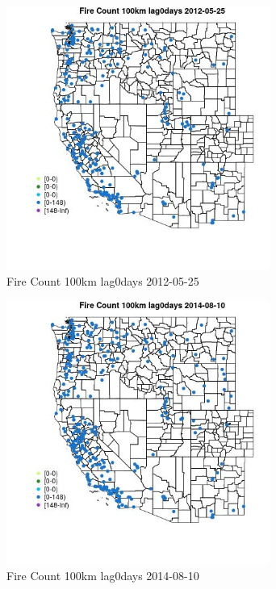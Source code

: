 \begin{figure} 
\centering  
\includegraphics[width=0.77\textwidth]{Code_Outputs/Report_ML_input_PM25_Step4_part_e_de_duplicated_aves_compiled_2019-05-18wNAs_MapObsFire_Count_100km_lag0days2012-05-25.jpg} 
\caption{\label{fig:Report_ML_input_PM25_Step4_part_e_de_duplicated_aves_compiled_2019-05-18wNAsMapObsFire_Count_100km_lag0days2012-05-25}Fire Count 100km lag0days 2012-05-25} 
\end{figure} 
 

\clearpage 

\begin{figure} 
\centering  
\includegraphics[width=0.77\textwidth]{Code_Outputs/Report_ML_input_PM25_Step4_part_e_de_duplicated_aves_compiled_2019-05-18wNAs_MapObsFire_Count_100km_lag0days2014-08-10.jpg} 
\caption{\label{fig:Report_ML_input_PM25_Step4_part_e_de_duplicated_aves_compiled_2019-05-18wNAsMapObsFire_Count_100km_lag0days2014-08-10}Fire Count 100km lag0days 2014-08-10} 
\end{figure} 
 

